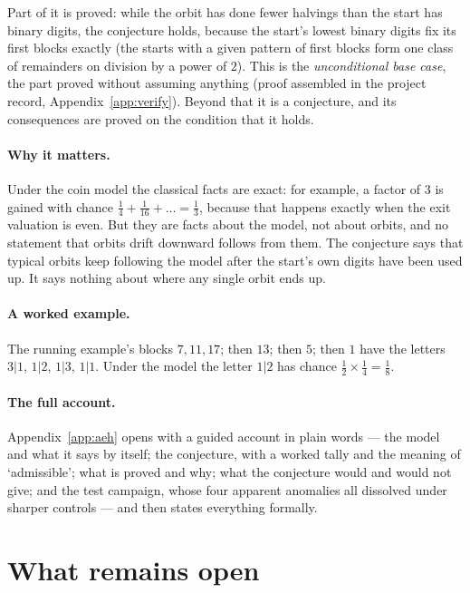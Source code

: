 \documentclass[11pt]{article}
\theoremstyle{remark}
\begin{document}
Part of it is proved: while the orbit has done fewer halvings than the start has binary digits, the conjecture holds, because the start's lowest binary digits fix its first blocks exactly (the starts with a given pattern of first blocks form one class of remainders on division by a power of $2$). This is the \emph{unconditional base case}, the part proved without assuming anything (proof assembled in the project record, Appendix~\ref{app:verify}). Beyond that it is a conjecture, and its consequences are proved on the condition that it holds.

\paragraph{Why it matters.} Under the coin model the classical facts are exact: for example, a factor of $3$ is gained with chance $\tfrac14 + \tfrac1{16} + \dots = \tfrac13$, because that happens exactly when the exit valuation is even. But they are facts about the model, not about orbits, and no statement that orbits drift downward follows from them. The conjecture says that typical orbits keep following the model after the start's own digits have been used up. It says nothing about where any single orbit ends up.

\paragraph{A worked example.} The running example's blocks $7, 11, 17$; then $13$; then $5$; then $1$ have the letters $3|1$, $1|2$, $1|3$, $1|1$. Under the model the letter $1|2$ has chance $\tfrac12 \times \tfrac14 = \tfrac18$.

\paragraph{The full account.} Appendix~\ref{app:aeh} opens with a guided account in plain words --- the model and what it says by itself; the conjecture, with a worked tally and the meaning of `admissible'; what is proved and why; what the conjecture would and would not give; and the test campaign, whose four apparent anomalies all dissolved under sharper controls --- and then states everything formally.

\section{What remains open}\label{sec:open}
\end{document}
